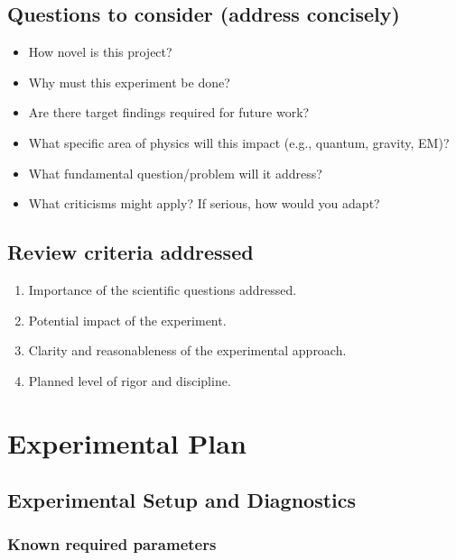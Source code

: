 \documentclass[11pt]{article}
\theoremstyle{plain}
\theoremstyle{remark}
\begin{document}
\subsection*{Questions to consider (address concisely)}
\begin{itemize}
  \item How novel is this project?
  \item Why must this experiment be done?
  \item Are there target findings required for future work?
  \item What specific area of physics will this impact (e.g., quantum, gravity, EM)?
  \item What fundamental question/problem will it address?
  \item What criticisms might apply? If serious, how would you adapt?
\end{itemize}

\subsection*{Review criteria addressed}
\begin{enumerate}[label=\textbf{(\arabic*)}]
  \item Importance of the scientific questions addressed.
  \item Potential impact of the experiment.
  \item Clarity and reasonableness of the experimental approach.
  \item Planned level of rigor and discipline.
\end{enumerate}

\section{Experimental Plan}

\subsection{Experimental Setup and Diagnostics} %

\subsubsection*{Known required parameters}
\end{document}
